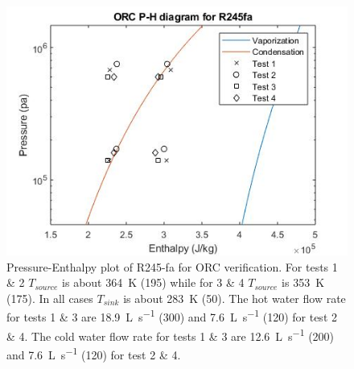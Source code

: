 \begin{figure}[h]
	\centering

	\includegraphics[width=\textwidth]{figures/VerificationPH01}

	\caption{Pressure-Enthalpy plot of R245-fa for ORC verification. 
	For tests 1 \& 2 $T_{source}$ is about \SI{364}{\kelvin} (\SI{195}{\degreeFahrenheit})
	while for 3 \& 4 $T_{source}$ is \SI{353}{\kelvin} (\SI{175}{\degreeFahrenheit}). 
	In all cases $T_{sink}$ is about \SI{283}{\kelvin} (\SI{50}{\degreeFahrenheit}). 
	The hot water flow rate for tests 1 \& 3 are \SI{18.9}{\liter\per\second} (\SI{300}{\gpm})
	and	\SI{7.6}{\liter\per\second} (\SI{120}{\gpm}) for test 2 \& 4. 
	The cold water flow rate for tests 1 \& 3 are \SI{12.6}{\liter\per\second} (\SI{200}{\gpm})
	and \SI{7.6}{\liter\per\second} (\SI{120}{\gpm}) for test 2 \& 4.}
	\label{fig:verifcation_ph01}
\end{figure}